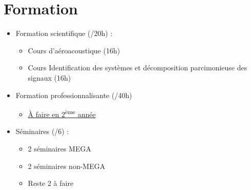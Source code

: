 \documentclass[10pt,xcolor=x11names,compress, notes=show]{beamer}%
\begin{document}
\section*{Formation}
\begin{frame}{\insertsectionhead}
	\begin{itemize}
	        \item Formation scientifique (/20h) :
	        \begin{itemize}
	        		\item Cours d’aéroacoustique (16h)
	        		\item Cours Identification des systèmes et décomposition parcimonieuse des signaux (16h)
		\end{itemize}
	        \item Formation professionnalisante (/40h)
	        \begin{itemize}
	        		\item \underline{À faire en 2\textsuperscript{ème} année}
		\end{itemize}
		\item Séminaires (/6) : 
		\begin{itemize}
	        		\item 2 séminaires MEGA
	        		\item 2 séminaires non-MEGA
	        		\item Reste 2 à faire
		\end{itemize}
	\end{itemize}
\end{frame}

\section*{}










% 
% 
\end{document}
